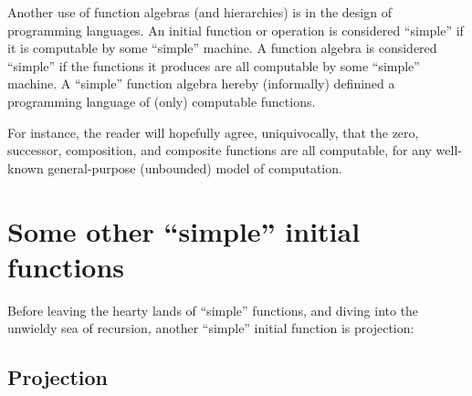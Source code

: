 Another use of function algebras (and hierarchies) is in the design of
programming languages.  An initial function or operation is considered
``simple'' if it is computable by some ``simple'' machine. A function algebra
is considered ``simple'' if the functions it produces are all computable by
some ``simple'' machine.  A ``simple'' function algebra hereby (informally)
definined a programming language of (only) computable functions.

For instance, the reader will hopefully agree, uniquivocally, that the zero,
successor, composition, and composite functions are all computable, for any
well-known general-purpose (unbounded) model of computation.







\section{Some other ``simple'' initial functions}

Before leaving the hearty lands of ``simple'' functions, and diving into the
unwieldy sea of recursion, another ``simple'' initial function is projection:

\subsection{Projection}

